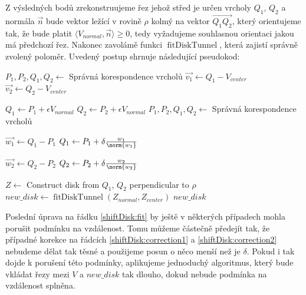 Z výsledných bodů zrekonstruujeme řez jehož střed je určen vrcholy
$ Q_1 $, $ Q_2 $ a normála $ \vec{n} $ bude vektor ležící v rovině $ \rho $
kolmý na vektor $ \overrightarrow{Q_1 Q_2} $, který orientujeme tak, že bude platit
$ \langle V_{normal}, \vec{n} \rangle \geq 0 $, tedy vyžadujeme souhlasnou
orientaci jakou má předchozí řez. Nakonec zavolámě funkci
$ \operatorname{fitDiskTunnel} $, která zajistí správně zvolený poloměr.
Uvedený postup shrnuje následující pseudokod:


\begin{algorithmic}[1]
\label{alg:shiftDisk}

    \State $ P_1, P_2, Q_1, Q_2 \gets $ Správná korespondence vrcholů
    \State $ \vec{v_1} \gets Q_1 - V_{center} $
    \State $ \vec{v_2} \gets Q_2 - V_{center} $
    \Statex

        \State $ Q_1 \gets P_1 + \epsilon V_{normal} $
        \State $ Q_2 \gets P_2 + \epsilon V_{normal} $
    \EndIf
    \State $ P_1, P_2, Q_1, Q_2 \gets $ Správná korespondence vrcholů
    \Statex

    \State $ \vec{w_1} \gets Q_1 - P_1 $
        $ Q_1 \gets P_1 + \delta \frac{w_1}{\norm{w_1}} $ \label{shiftDisk:correction1}
    \EndIf

    \State $ \vec{w_2} \gets Q_2 - P_2 $
        $ Q_2 \gets P_2 + \delta \frac{w_2}{\norm{w_2}} $ \label{shiftDisk:correction2}
    \EndIf
    \Statex

    \State $ Z \gets $ Construct disk from $ Q_1$, $Q_2$ perpendicular to $ \rho $
    \State $ new\_disk \gets \operatorname{fitDiskTunnel}(Z_{normal}, Z_{center}) $ \label{shiftDisk:fit}
    \State \Return $ new\_disk $
\EndFunction

\end{algorithmic}

Poslední úprava na řádku \ref{shiftDisk:fit} by ještě v některých případech mohla
porušit podmínku na vzdálenost. Tomu můžeme částečně předejít tak, že případné korekce
na řádcích \ref{shiftDisk:correction1} a \ref{shiftDisk:correction2} nebudeme
dělat tak těsné a použijeme posun o něco menší než je $ \delta $. Pokud i tak
dojde k porušení této podmínky, aplikujeme jednoduchý algoritmus, který bude
vkládat řezy mezi $ V $ a $ new\_disk $ tak dlouho, dokud nebude podmínka na
vzdálenost splněna.


